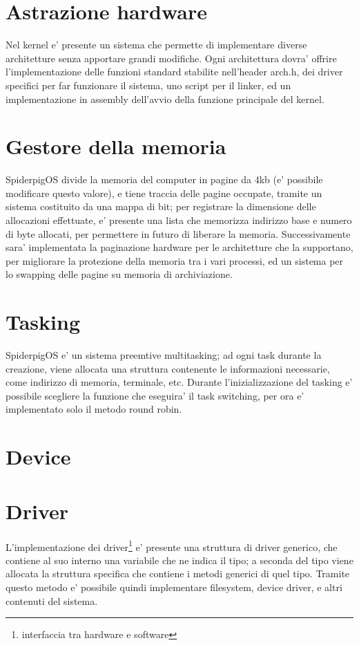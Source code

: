 \documentclass[a4paper,10pt]{book}
\begin{document}
\section{Astrazione hardware}
Nel kernel e' presente un sistema che permette di implementare diverse architetture senza apportare grandi
modifiche. Ogni architettura dovra' offrire l'implementazione delle funzioni standard stabilite nell'header 
arch.h, dei driver specifici per far funzionare il sistema, uno script per il linker, ed un implementazione in
assembly dell'avvio della funzione principale del kernel.

\section{Gestore della memoria}
SpiderpigOS divide la memoria del computer in pagine da 4kb (e' possibile modificare questo valore), e tiene
traccia delle pagine occupate, tramite un sistema costituito da una mappa di bit; per registrare la dimensione 
delle allocazioni effettuate, e' presente una lista che memorizza indirizzo base e numero di byte allocati,
per permettere in futuro di liberare la memoria. 
Successivamente sara' implementata la paginazione hardware per le architetture che la supportano,
per migliorare la protezione della memoria tra i vari processi, ed un sistema per lo swapping delle pagine su
memoria di archiviazione.

\section{Tasking}
SpiderpigOS e' un sistema preemtive multitasking; ad ogni task durante la creazione, viene allocata una 
struttura contenente le informazioni necessarie, come indirizzo di memoria, terminale, etc. Durante 
l'inizializzazione del tasking e' possibile scegliere la funzione che eseguira' il task switching, per 
ora e' implementato solo il metodo round robin. 


\section{Device}
 
\section{Driver}
L'implementazione dei driver\footnote{interfaccia tra hardware e software} e' presente una struttura di 
driver generico, che contiene al suo interno una variabile che ne indica il tipo; a 
seconda del tipo viene allocata la struttura specifica che contiene i metodi generici di quel tipo. 
Tramite questo metodo e' possibile quindi implementare filesystem, device driver, e altri contenuti del sistema.
\end{document}
